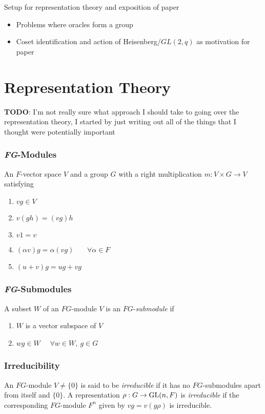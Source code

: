 \documentclass[12pt,twoside]{reedthesis}
\theoremstyle{definition}\newtheorem{definition}{Definition}
\theoremstyle{definition}\newtheorem{example}{Example}
\newcommand{\TODO}[1]{{ \color{red} \textbf{TODO}: {#1}}}
\begin{document}
   \noindent Setup for representation theory and exposition of paper
        \begin{itemize}
            \item Problems where oracles form a group
            \item Coset identification and action of Heisenberg/$GL(2,q) $ as motivation for paper
        \end{itemize}

\chapter{Representation Theory}

\TODO{I'm not really sure what approach I should take to going over the representation theory, I started by just writing out all of the things that I thought were potentially important}

\subsection{\textit{FG}-Modules}
An $F$-vector space $V$ and a group $G$ with a right 
multiplication $m : V \times G \rightarrow V$ satisfying

\begin{enumerate}[label=(\arabic*), topsep=-3px, itemsep=-3px]
    \item $vg \in V$
    \item $v(gh) = (vg)h$
    \item $v1 = v$
    \item $(\alpha v)g = \alpha(vg)$ \ \ \ $\forall \alpha \in F$
    \item $(u + v)g = ug + vg$
\end{enumerate}

\bigskip
\subsection{\textit{FG}-Submodules}
A subset $W$ of an $FG$-module $V$ is an $FG$-\textit{submodule} if 
\begin{enumerate}[label=(\arabic*), topsep=-3px, itemsep=-3px]
    \item $W$ is a vector subspace of $V$
    \item $wg \in W$ \ \  $\forall w\in W,\ g \in G$
\end{enumerate}

\bigskip
\subsection{Irreducibility}
An $FG$-module $V \neq \{0\}$ is said to be \textit{irreducible} if 
it has no $FG$-submodules apart from itself and $\{0\}$. 
A representation $\rho : G \rightarrow \operatorname{GL}(n, F)$ is \textit{irreducible} 
if the corresponding $FG$-module $F^n$ given by $vg = v(g\rho)$ is irreducible. 
\end{document}
